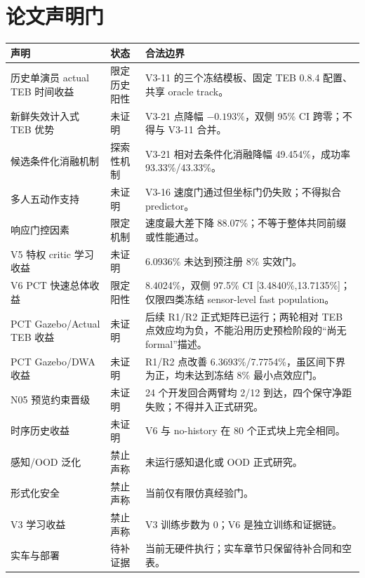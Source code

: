 \documentclass[12pt,a4paper,oneside]{report}
\begin{document}
\chapter{论文声明门}
\small
\begin{longtable}{p{}p{}p{}}
\toprule
声明 & 状态 & 合法边界\\
\midrule
\endhead
历史单演员 actual TEB 时间收益 & 限定历史阳性 & V3-11 的三个冻结模板、固定 TEB 0.8.4 配置、共享 oracle track。\\
新鲜失效计入式 TEB 优势 & 未证明 & V3-21 点降幅 $-0.193\%$，双侧 95\% CI 跨零；不得与 V3-11 合并。\\
候选条件化消融机制 & 探索性机制 & V3-21 相对去条件化消融降幅 49.454\%，成功率 93.33\%/43.33\%。\\
多人五动作支持 & 未证明 & V3-16 速度门通过但坐标门仍失败；不得拟合 predictor。\\
响应门控因素 & 限定机制 & 速度最大差下降 88.07\%；不等于整体共同前缀或性能通过。\\
V5 特权 critic 学习收益 & 未证明 & 6.0936\% 未达到预注册 8\% 实效门。\\
V6 PCT 快速总体收益 & 限定阳性 & 8.4024\%，双侧 97.5\% CI [3.4840\%,13.7135\%]；仅限四类冻结 sensor-level fast population。\\
PCT Gazebo/Actual TEB 收益 & 未证明 & 后续 R1/R2 正式矩阵已运行；两轮相对 TEB 点效应均为负，不能沿用历史预检阶段的“尚无 formal”描述。\\
PCT Gazebo/DWA 收益 & 未证明 & R1/R2 点改善 6.3693\%/7.7754\%，虽区间下界为正，均未达到冻结 8\% 最小点效应门。\\
N05 预览约束晋级 & 未证明 & 24 个开发回合两臂均 2/12 到达，四个保守净距失败；不得并入正式研究。\\
时序历史收益 & 未证明 & V6 与 no-history 在 80 个正式块上完全相同。\\
感知/OOD 泛化 & 禁止声称 & 未运行感知退化或 OOD 正式研究。\\
形式化安全 & 禁止声称 & 当前仅有限仿真经验门。\\
V3 学习收益 & 禁止声称 & V3 训练步数为 0；V6 是独立训练和证据链。\\
实车与部署 & 待补证据 & 当前无硬件执行；实车章节只保留待补合同和空表。\\
\bottomrule
\end{longtable}
\normalsize
\end{document}
